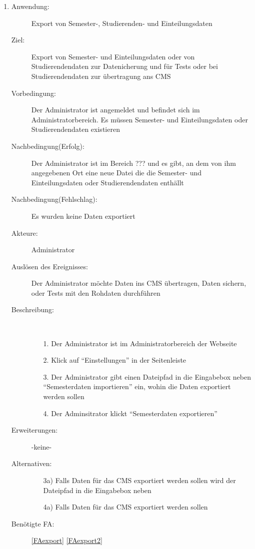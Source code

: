 \documentclass[parskip=full]{scrartcl}
\newcommand{\swtLabel}[1]{\textbf{/#1\arabic*0/}}
\begin{document}
\begin{enumerate} [label=\swtLabel{A}]
      \item \label{UCadminExport}
    \begin{description}
    \item[Anwendung:] Export von Semester-, Studierenden- und
    Einteilungsdaten
    \item[Ziel:] Export von Semester- und Einteilungsdaten oder von
    Studierendendaten zur Datenicherung und für Tests oder bei Studierendendaten
    zur übertragung ans \gls{CMS}
    \item[Vorbedingung:] Der Administrator ist angemeldet und befindet sich im
    Administratorbereich. Es müssen Semester- und Einteilungsdaten oder
    Studierendendaten existieren %
    \item[Nachbedingung(Erfolg):] Der Administrator ist im Bereich
    ??? und es gibt, an dem von ihm angegebenen Ort eine neue Datei die die Semester- und Einteilungsdaten oder
    Studierendendaten enthällt
    \item[Nachbedingung(Fehlschlag):] Es wurden keine Daten exportiert
    \item[Akteure:] Administrator
    \item[Auslösen des Ereignisses:] Der Administrator möchte Daten ins
    \gls{CMS} übertragen, Daten sichern, oder Tests mit den Rohdaten durchführen
    \item[Beschreibung:]~
    \begin{enumerate}
      \item[1.] Der Administrator ist im Administratorbereich der Webseite
      \item[2.] Klick auf \enquote{Einstellungen} %
      in der Seitenleiste
       \item[3.] Der Administrator gibt einen Dateipfad in die Eingabebox neben
       \enquote{Semesterdaten importieren} ein, wohin die Daten exportiert
       werden sollen
      \item[4.] Der Adminsitrator klickt \enquote{Semesterdaten exportieren}
      
    \end{enumerate}
    \item[Erweiterungen:] -keine-
    \item[Alternativen:] 
        
        \begin{enumerate}
          \item [3a)] Falls Daten für das \gls{CMS} exportiert werden sollen
          wird der Dateipfad in die Eingabebox neben %
          \item [4a)]Falls Daten für das \gls{CMS} exportiert werden sollen
        \end{enumerate}
    \item[Benötigte FA:] \ref{FAexport} \ref{FAexport2}
  \end{description}
  

\end{enumerate}
\end{document}
